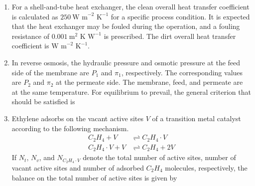 \documentclass[journal,12pt,onecolumn]{IEEEtran}
\theoremstyle{remark}
\begin{document}
\begin{enumerate}
\item For a shell-and-tube heat exchanger, the clean overall heat transfer coefficient is calculated as $250~\text{W m}^{-2}\text{ K}^{-1}$ for a specific process condition. It is expected that the heat exchanger may be fouled during the operation, and a fouling resistance of $0.001~\text{m}^{2}\text{ K W}^{-1}$ is prescribed. The dirt overall heat transfer coefficient is \underline{\hspace{2cm}} $\text{W m}^{-2}\text{ K}^{-1}$.

\hfill{}

\item In reverse osmosis, the hydraulic pressure and osmotic pressure at the feed side of the membrane are $P_1$ and $\pi_1$, respectively. The corresponding values are $P_2$ and $\pi_2$ at the permeate side. The membrane, feed, and permeate are at the same temperature. For equilibrium to prevail, the general criterion that should be satisfied is

\hfill{}

\begin{enumerate}
\end{enumerate}

\item Ethylene adsorbs on the vacant active sites $V$ of a transition metal catalyst according to the following mechanism.
\begin{align*}
C_2H_4 + V &\rightleftharpoons C_2H_4 \cdot V \\
C_2H_4 \cdot V + V &\rightleftharpoons C_2H_4 + 2V
\end{align*}
If $N_t$, $N_v$, and $N_{C_2H_4 \cdot V}$ denote the total number of active sites, number of vacant active sites and number of adsorbed $C_2H_4$ molecules, respectively, the balance on the total number of active sites is given by

\hfill{}

\begin{enumerate}
\end{enumerate}


\end{enumerate}
\end{document}
